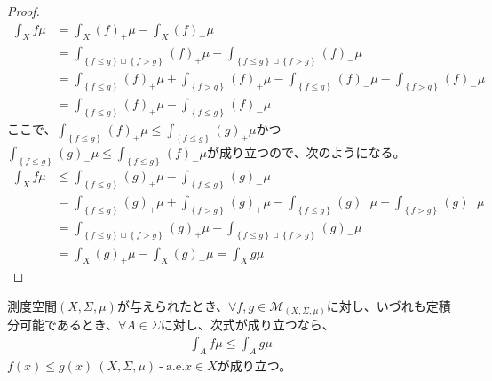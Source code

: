 \documentclass[dvipdfmx]{jsarticle}
\begin{document}
\begin{proof}
\begin{align*}
\int_{X} {f\mu} &= \int_{X} {(f)_{+}\mu} - \int_{X} {(f)_{-}\mu}\\
&= \int_{\left\{ f \leq g \right\} \sqcup \left\{ f > g \right\}} {(f)_{+}\mu} - \int_{\left\{ f \leq g \right\} \sqcup \left\{ f > g \right\}} {(f)_{-}\mu}\\
&= \int_{\left\{ f \leq g \right\}} {(f)_{+}\mu} + \int_{\left\{ f > g \right\}} {(f)_{+}\mu} - \int_{\left\{ f \leq g \right\}} {(f)_{-}\mu} - \int_{\left\{ f > g \right\}} {(f)_{-}\mu}\\
&= \int_{\left\{ f \leq g \right\}} {(f)_{+}\mu} - \int_{\left\{ f \leq g \right\}} {(f)_{-}\mu}
\end{align*}
ここで、$\int_{\left\{ f \leq g \right\}} {(f)_{+}\mu} \leq \int_{\left\{ f \leq g \right\}} {(g)_{+}\mu}$かつ$\int_{\left\{ f \leq g \right\}} {(g)_{-}\mu} \leq \int_{\left\{ f \leq g \right\}} {(f)_{-}\mu}$が成り立つので、次のようになる。
\begin{align*}
\int_{X} {f\mu} &\leq \int_{\left\{ f \leq g \right\}} {(g)_{+}\mu} - \int_{\left\{ f \leq g \right\}} {(g)_{-}\mu}\\
&= \int_{\left\{ f \leq g \right\}} {(g)_{+}\mu} + \int_{\left\{ f > g \right\}} {(g)_{+}\mu} - \int_{\left\{ f \leq g \right\}} {(g)_{-}\mu} - \int_{\left\{ f > g \right\}} {(g)_{-}\mu}\\
&= \int_{\left\{ f \leq g \right\} \sqcup \left\{ f > g \right\}} {(g)_{+}\mu} - \int_{\left\{ f \leq g \right\} \sqcup \left\{ f > g \right\}} {(g)_{-}\mu}\\
&= \int_{X} {(g)_{+}\mu} - \int_{X} {(g)_{-}\mu} = \int_{X} {g\mu}
\end{align*}
\end{proof}
\begin{thm}\label{4.6.3.6}
測度空間$(X,\varSigma,\mu)$が与えられたとき、$\forall f,g \in \mathcal{M}_{(X,\varSigma,\mu)}$に対し、いづれも定積分可能であるとき、$\forall A \in \varSigma$に対し、次式が成り立つなら、
\begin{align*}
\int_{A} {f\mu} \leq \int_{A} {g\mu}
\end{align*}
$f(x) \leq g(x)\ (X,\varSigma,\mu) \ \text{-} \ \mathrm{a.e.}x \in X$が成り立つ。
\end{thm}
\end{document}

